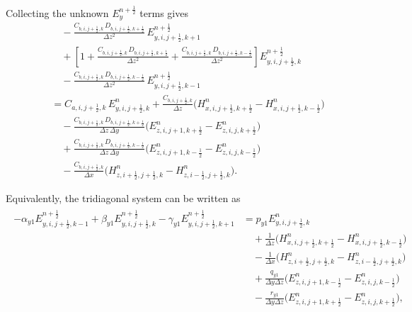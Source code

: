\documentclass{article}
\numberwithin{equation}{section}
\numberwithin{figure}{section}
\begin{document}
Collecting the unknown $E_{y}^{n+\frac12}$ terms gives
\begin{equation}
    \begin{aligned}
         & \quad -\frac{C_{b,i,j+\tfrac12,k}\,D_{b,i,j+\tfrac12,k+\tfrac12}}{\Delta z^2}\, E_{y,i,j+\tfrac12,k+1}^{n+\frac12}                                                                                     \\
         & \quad + \left[1+\frac{C_{b,i,j+\tfrac12,k}\,D_{b,i,j+\tfrac12,k+\tfrac12}}{\Delta z^2} +\frac{C_{b,i,j+\tfrac12,k}\,D_{b,i,j+\tfrac12,k-\tfrac12}}{\Delta z^2}\right] E_{y,i,j+\tfrac12,k}^{n+\frac12} \\
         & \quad - \frac{C_{b,i,j+\tfrac12,k}\,D_{b,i,j+\tfrac12,k-\tfrac12}}{\Delta z^2}\, E_{y,i,j+\tfrac12,k-1}^{n+\frac12}                                                                                    \\
         & = C_{a,i,j+\tfrac12,k}\, E_{y,i,j+\tfrac12,k}^{n} + \frac{C_{b,i,j+\tfrac12,k}}{\Delta z} \Big(H_{x,i,j+\tfrac12,k+\tfrac12}^{n}-H_{x,i,j+\tfrac12,k-\tfrac12}^{n}\Big)                                \\
         & \quad - \frac{C_{b,i,j+\tfrac12,k}\,D_{b,i,j+\tfrac12,k+\tfrac12}}{\Delta z\,\Delta y} \Big(E_{z,i,j+1,k+\tfrac12}^{n}-E_{z,i,j,k+\tfrac12}^{n}\Big)                                                   \\
         & \quad + \frac{C_{b,i,j+\tfrac12,k}\,D_{b,i,j+\tfrac12,k-\tfrac12}}{\Delta z\,\Delta y} \Big(E_{z,i,j+1,k-\tfrac12}^{n}-E_{z,i,j,k-\tfrac12}^{n}\Big)                                                   \\
         & \quad - \frac{C_{b,i,j+\tfrac12,k}}{\Delta x} \Big(H_{z,i+\tfrac12,j+\tfrac12,k}^{n}-H_{z,i-\tfrac12,j+\tfrac12,k}^{n}\Big).
    \end{aligned}
\end{equation}

Equivalently, the tridiagonal system can be written as
\begin{align}
    \begin{split}
        -\alpha_{y1}E_{y,i,j+\tfrac12,k-1}^{n+\frac12} + \beta_{y1}E_{y,i,j+\tfrac12,k}^{n+\frac12} - \gamma_{y1}E_{y,i,j+\tfrac12,k+1}^{n+\frac12}
         & = p_{y1}E_{y,i,j+\tfrac12,k}^{n}                                                                       \\
         & \quad +\frac{1}{\Delta z}\Big(H_{x,i,j+\tfrac12,k+\tfrac12}^{n}-H_{x,i,j+\tfrac12,k-\tfrac12}^{n}\Big) \\
         & \quad -\frac{1}{\Delta x}\Big(H_{z,i+\tfrac12,j+\tfrac12,k}^{n}-H_{z,i-\tfrac12,j+\tfrac12,k}^{n}\Big) \\
         & \quad +\frac{q_{y1}}{\Delta y\Delta z}\Big(E_{z,i,j+1,k-\tfrac12}^{n}-E_{z,i,j,k-\tfrac12}^{n}\Big)    \\
         & \quad -\frac{r_{y1}}{\Delta y\Delta z}\Big(E_{z,i,j+1,k+\tfrac12}^{n}-E_{z,i,j,k+\tfrac12}^{n}\Big),
    \end{split}
    \label{eq:first-e-ey-adi-tridiagonal}
\end{align}
\end{document}
